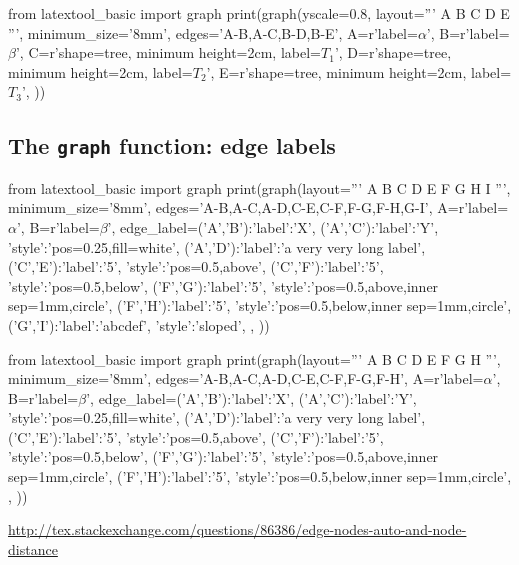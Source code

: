 \begin{python}
from latextool_basic import graph
print(graph(yscale=0.8, layout='''
     A
   B   C
  D E
''',
minimum_size='8mm',
edges='A-B,A-C,B-D,B-E',
A=r'label=$\alpha$',
B=r'label=$\beta$',
C=r'shape=tree, minimum height=2cm, label=$T_1$',
D=r'shape=tree, minimum height=2cm, label=$T_2$',
E=r'shape=tree, minimum height=2cm, label=$T_3$',
))
\end{python}


\newpage
\subsection{The \texttt{graph} function: edge labels}


\begin{console}
from latextool_basic import graph
print(graph(layout='''
          A
   B      C      D
       E     F
          G     H
       I
''',
minimum_size='8mm',
edges='A-B,A-C,A-D,C-E,C-F,F-G,F-H,G-I',
A=r'label=$\alpha$',
B=r'label=$\beta$',
edge_label={('A','B'):{'label':'X'},
            ('A','C'):{'label':'Y', 'style':'pos=0.25,fill=white'},
            ('A','D'):{'label':'a very very long label'},
            ('C','E'):{'label':'5', 'style':'pos=0.5,above'},
            ('C','F'):{'label':'5', 'style':'pos=0.5,below'},
            ('F','G'):{'label':'5', 'style':'pos=0.5,above,inner sep=1mm,circle'},
            ('F','H'):{'label':'5', 'style':'pos=0.5,below,inner sep=1mm,circle'},
            ('G','I'):{'label':'abcdef', 'style':'sloped'},
           },
))
\end{console}
\begin{python}
from latextool_basic import graph
print(graph(layout='''
          A
   B      C      D
       E     F
          G     H
''',
minimum_size='8mm',
edges='A-B,A-C,A-D,C-E,C-F,F-G,F-H',
A=r'label=$\alpha$',
B=r'label=$\beta$',
edge_label={('A','B'):{'label':'X'},
            ('A','C'):{'label':'Y', 'style':'pos=0.25,fill=white'},
            ('A','D'):{'label':'a very very long label'},
            ('C','E'):{'label':'5', 'style':'pos=0.5,above'},
            ('C','F'):{'label':'5', 'style':'pos=0.5,below'},
            ('F','G'):{'label':'5', 'style':'pos=0.5,above,inner sep=1mm,circle'},
            ('F','H'):{'label':'5', 'style':'pos=0.5,below,inner sep=1mm,circle'},
           },
))
\end{python}


\url{http://tex.stackexchange.com/questions/86386/edge-nodes-auto-and-node-distance}
